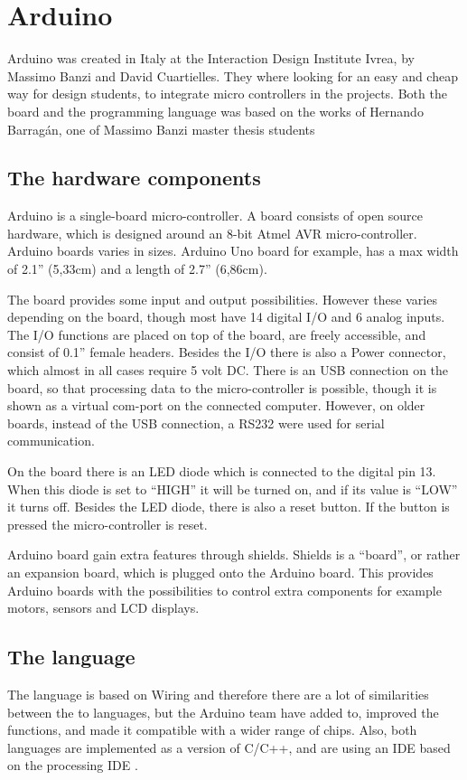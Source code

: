 \section{Arduino}\label{analysis:arduino}
Arduino was created in Italy at the Interaction Design Institute Ivrea, by Massimo Banzi and David Cuartielles. They where looking for an easy and cheap way for design students, to integrate micro controllers in the projects\cite{arduino:hist}. Both the board and the programming language was based on the works of Hernando Barragán, one of Massimo Banzi master thesis students \cite{Wiring:thesis}

\subsection{The hardware components}
Arduino is a single-board micro-controller.
A board consists of open source hardware, which is designed around an 8-bit Atmel AVR micro-controller. Arduino boards varies in sizes. Arduino Uno board for example, has a max width of 2.1'' (5,33cm) and a length of 2.7'' (6,86cm). 

The board provides some input and output possibilities. However these varies depending on the board, though most have 14 digital I/O and 6 analog inputs. The I/O functions are placed on top of the board, are freely accessible, and consist of 0.1'' female headers. Besides the I/O there is also a Power connector, which almost in all cases require 5 volt DC. There is an USB connection on the board, so that processing data to the micro-controller is possible, though it is shown as a virtual com-port on the connected computer. However, on older boards, instead of the USB connection, a RS232 were used for serial communication. 

On the board there is an LED diode which is connected to the digital pin 13. When this diode is set to ``HIGH'' it will be turned on, and if its value is ``LOW'' it turns off. Besides the LED diode, there is also a reset button. If the button is pressed the micro-controller is reset. 

Arduino board gain extra features through shields. Shields is a ``board'', or rather an expansion board, which is plugged onto the Arduino board. This provides Arduino boards with the possibilities to control extra components for example motors, sensors and LCD displays.

\subsection{The language}
The language is based on Wiring and therefore there are a lot of similarities between the to languages, but the Arduino team have added to, improved the functions, and made it compatible with a wider range of chips. Also, both languages are implemented as a  version of C/C++, and are using an IDE based on the processing IDE \cite{Wiring:thesis}\cite{Arduino:IDE}.\\

